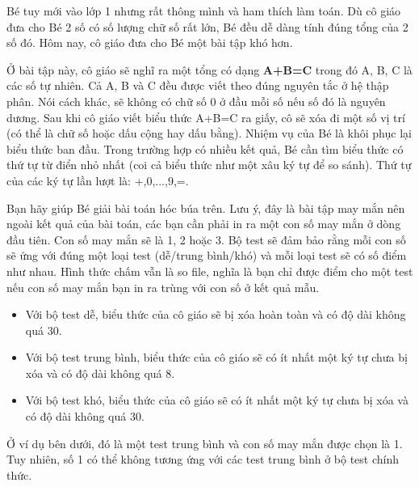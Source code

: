 Bé tuy mới vào lớp 1 nhưng rất thông mình và ham thích làm toán. Dù cô giáo đưa cho Bé 2 số có số lượng chữ số rất lớn, Bé đều dễ dàng tính đúng tổng của 2 số đó. Hôm nay, cô giáo đưa cho Bé một bài tập khó hơn.  

   Ở bài tập này, cô giáo sẽ nghĩ ra một tổng có dạng   \textbf{    A+B=C   }   trong đó A, B, C là các số tự nhiên. Cả A, B và C đều được viết theo đúng nguyên tắc ở hệ thập phân. Nói cách khác, sẽ không có chữ số 0 ở đầu mỗi số nếu số đó là nguyên dương. Sau khi cô giáo viết biểu thức A+B=C ra giấy, cô sẽ xóa đi một số vị trí (có thể là chữ số hoặc dấu cộng hay dấu bằng). Nhiệm vụ của Bé là khôi phục lại biểu thức ban đầu. Trong trường hợp có nhiều kết quả, Bé cần tìm biểu thức có thứ tự từ điển nhỏ nhất (coi cả biểu thức như một xâu ký tự để so sánh). Thứ tự của các ký tự lần lượt là: +,0,...,9,=.  

   Bạn hãy giúp Bé giải bài toán hóc búa trên. Lưu ý, đây là bài tập may mắn nên ngoài kết quả của bài toán, các bạn cần phải in ra một con số may mắn ở dòng đầu tiên. Con số may mắn sẽ là 1, 2 hoặc 3. Bộ test sẽ đảm bảo rằng mỗi con số sẽ ứng với đúng một loại test (dễ/trung bình/khó) và mỗi loại test sẽ có số điểm như nhau. Hình thức chấm vẫn là so file, nghĩa là bạn chỉ được điểm cho một test nếu con số may mắn bạn in ra trùng với con số ở kết quả mẫu.  
\begin{itemize}
	\item     Với bộ test dễ, biểu thức của cô giáo sẽ bị xóa hoàn toàn và có độ dài không quá 30.   
\end{itemize}
\begin{itemize}
	\item     Với bộ test trung bình, biểu thức của cô giáo sẽ có ít nhất một ký tự chưa bị xóa và có độ dài không quá 8.   
\end{itemize}
\begin{itemize}
	\item     Với bộ test khó, biểu thức của cô giáo sẽ có ít nhất một ký tự chưa bị xóa và có độ dài không quá 30.   
\end{itemize}

   Ở ví dụ bên dưới, đó là một test trung bình và con số may mắn được chọn  là 1. Tuy nhiên, số 1 có thể không tương ứng với các test trung bình ở  bộ test chính thức.  

\